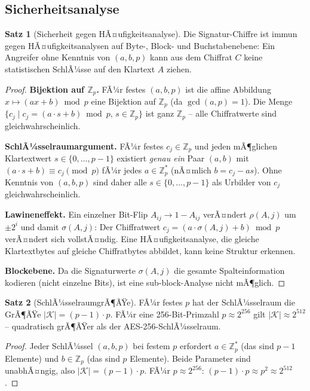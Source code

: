 ﻿\documentclass[a4paper,12pt]{article}
\theoremstyle{definition}
\newtheorem{satz}{Satz}[section]
\begin{document}
\subsection{Sicherheitsanalyse}

\begin{satz}[Sicherheit gegen HÃ¤ufigkeitsanalyse]
\label{satz:pqc-freq}
Die Signatur-Chiffre ist immun gegen HÃ¤ufigkeitsanalysen auf Byte-, Block- und
Buchstabenebene: Ein Angreifer ohne Kenntnis von $(a, b, p)$ kann aus dem
Chiffrat $C$ keine statistischen SchlÃ¼sse auf den Klartext $A$ ziehen.
\end{satz}

\begin{proof}
\textbf{Bijektion auf $\mathbb{Z}_p$.}
FÃ¼r festes $(a, b, p)$ ist die affine Abbildung $x \mapsto (ax+b) \bmod p$
eine Bijektion auf $\mathbb{Z}_p$ (da $\gcd(a,p) = 1$).
Die Menge $\{c_j \mid c_j = (a\cdot s + b)\bmod p,\, s \in \mathbb{Z}_p\}$
ist ganz $\mathbb{Z}_p$ -- alle Chiffratwerte sind gleichwahrscheinlich.

\textbf{SchlÃ¼sselraumargument.}
FÃ¼r festes $c_j \in \mathbb{Z}_p$ und jeden mÃ¶glichen Klartextwert
$s \in \{0,\ldots,p-1\}$ existiert \emph{genau ein} Paar $(a, b)$ mit
$(a \cdot s + b) \equiv c_j \pmod{p}$ fÃ¼r jedes $a \in \mathbb{Z}_p^*$
(nÃ¤mlich $b = c_j - as$). Ohne Kenntnis von $(a, b, p)$ sind daher alle
$s \in \{0,\ldots,p-1\}$ als Urbilder von $c_j$ gleichwahrscheinlich.

\textbf{Lawineneffekt.}
Ein einzelner Bit-Flip $A_{ij} \to 1 - A_{ij}$ verÃ¤ndert $\rho(A,j)$ um
$\pm 2^i$ und damit $\sigma(A,j)$: Der Chiffratwert $c_j = (a\cdot\sigma(A,j) + b)\bmod p$
verÃ¤ndert sich vollstÃ¤ndig. Eine HÃ¤ufigkeitsanalyse, die gleiche Klartextbytes
auf gleiche Chiffratbytes abbildet, kann keine Struktur erkennen.

\textbf{Blockebene.}
Da die Signaturwerte $\sigma(A,j)$ die gesamte Spalteinformation kodieren
(nicht einzelne Bits), ist eine sub-block-Analyse nicht mÃ¶glich.
\end{proof}

\begin{satz}[SchlÃ¼sselraumgrÃ¶ÃŸe]
\label{satz:pqc-keyspace}
FÃ¼r festes $p$ hat der SchlÃ¼sselraum die GrÃ¶ÃŸe $|\mathcal{K}| = (p-1) \cdot p$.
FÃ¼r eine 256-Bit-Primzahl $p \approx 2^{256}$ gilt
$|\mathcal{K}| \approx 2^{512}$ -- quadratisch grÃ¶ÃŸer als der AES-256-SchlÃ¼sselraum.
\end{satz}

\begin{proof}
Jeder SchlÃ¼ssel $(a, b, p)$ bei festem $p$ erfordert $a \in \mathbb{Z}_p^*$
(das sind $p-1$ Elemente) und $b \in \mathbb{Z}_p$ (das sind $p$ Elemente).
Beide Parameter sind unabhÃ¤ngig, also $|\mathcal{K}| = (p-1) \cdot p$.
FÃ¼r $p \approx 2^{256}$: $(p-1) \cdot p \approx p^2 \approx 2^{512}$.
\end{proof}
\end{document}
